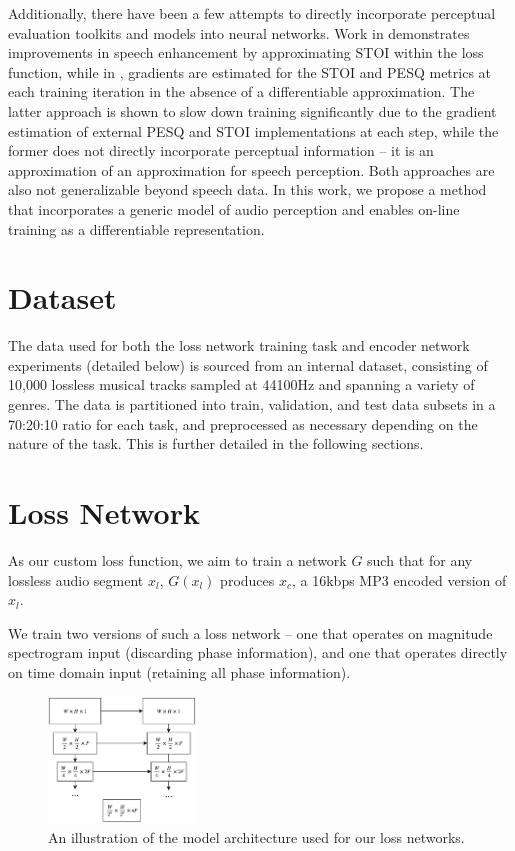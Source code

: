 \documentclass[sigconf]{acmart}
\begin{document}
Additionally, there have been a few attempts to directly incorporate perceptual evaluation toolkits and models into neural networks.  Work in \cite{stoi-direct} demonstrates improvements in speech enhancement by approximating STOI within the loss function, while in \cite{stoi-gradient}, gradients are estimated for the STOI and PESQ metrics at each training iteration in the absence of a differentiable approximation.  The latter approach is shown to slow down training significantly due to the gradient estimation of external PESQ and STOI implementations at each step, while the former does not directly incorporate perceptual information -- it is an approximation of an approximation for speech perception.  Both approaches are also not generalizable beyond speech data.  In this work, we propose a method that incorporates a generic model of audio perception and enables on-line training as a differentiable representation. 

\section{Dataset}
The data used for both the loss network training task and encoder network experiments (detailed below) is sourced from an internal dataset, consisting of 10,000 lossless musical tracks sampled at 44100Hz and spanning a variety of genres. The data is partitioned into train, validation, and test data subsets in a 70:20:10 ratio for each task, and preprocessed as necessary depending on the nature of the task.  This is further detailed in the following sections.

\section{Loss Network}
\label{sec:loss_network}

As our custom loss function, we aim to train a network $G$ such that for any lossless audio segment $x_{l}$, $G(x_{l})$ produces $x_{c}$, a 16kbps MP3 encoded version of $x_{l}$. 

We train two versions of such a loss network -- one that operates on magnitude spectrogram input (discarding phase information), and one that operates directly on time domain input (retaining all phase information).

\begin{figure}[h!]
    \centering
    \includegraphics[width=0.35\textwidth]{Unetwork.png}
    \caption{An illustration of the model architecture used for our loss networks.}
    \label{unet}
\end{figure}
\end{document}
